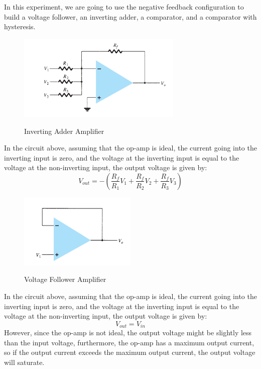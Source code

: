 \documentclass[12pt]{article}
\begin{document}
In this experiment, we are going to use the negative feedback configuration to build a voltage follower, an inverting adder, a comparator, and a comparator with hysteresis.
\begin{figure}[H]
    \centering
    \includegraphics[width=0.7\textwidth]{assets//main/2023-08-27-22-36-03.png}
    \caption{Inverting Adder Amplifier}
    \cite{my_book}
\end{figure}
In the circuit above, assuming that the op-amp is ideal, the current going into the inverting input is zero, and the voltage at the inverting input is equal to the voltage at the non-inverting input, the output voltage is given by:
\begin{equation}
    V_{out} = -(\frac{R_f}{R_{1}}V_1 + \frac{R_f}{R_{2}}V_2 + \frac{R_f}{R_{3}}V_3)
\end{equation}
\begin{figure}[H]
    \centering
    \includegraphics[width=0.5\textwidth]{assets//main/2023-08-27-22-48-49.png}
    \caption{Voltage Follower Amplifier}
    \cite{my_book}
\end{figure}
In the circuit above, assuming that the op-amp is ideal, the current going into the inverting input is zero, and the voltage at the inverting input is equal to the voltage at the non-inverting input, the output voltage is given by:
\begin{equation}
    V_{out} = V_{in}
\end{equation}
However, since the op-amp is not ideal, the output voltage might be slightly less than the input voltage, furthermore, the op-amp has a maximum output current, so if the output current exceeds the maximum output current, the output voltage will saturate.
\end{document}
